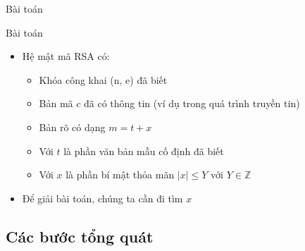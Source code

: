 \begin{frame}{Bài toán}

\begin{block}{Bài toán}
\begin{itemize}
\item Hệ mật mã RSA có:

\begin{itemize}
\item Khóa công khai (n, e) đã biết
\item Bản mã $c$ đã có thông tin (ví dụ   trong  quá trình truyền tin)
\item Bản rõ có dạng $m = t + x$
\item Với $t$ là phần văn bản mẫu cố định đã biết
\item Với $x$ là phần bí mật thỏa mãn $|x| \leq Y$ với \(Y \in \mathbb{Z} \)
\end{itemize}
\item Để giải bài toán, chúng ta cần đi tìm $x$
\end{itemize}

\end{block}

\end{frame}
\subsection{Các bước tổng quát}

